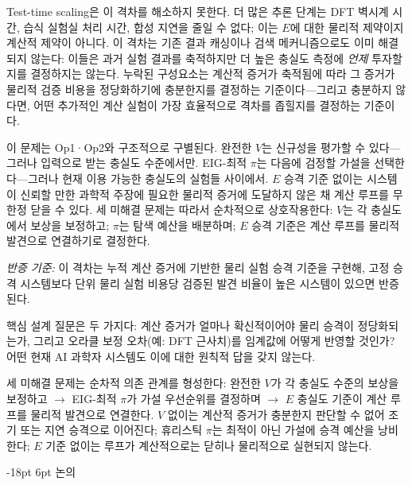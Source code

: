 \documentclass[11pt]{article}
\makeatletter
\renewcommand\section{\@startsection{section}{1}{\z@}%
  {-18pt \@plus -4pt \@minus -2pt}%
  {6pt \@plus 2pt}%
  {\normalfont\large\bfseries}}
\makeatother
\begin{document}
Test-time scaling은 이 격차를 해소하지 못한다. 더 많은 추론 단계는 DFT 벽시계 시간, 습식 실험실 처리 시간, 합성 지연을 줄일 수 없다; 이는 $E$에 대한 물리적 제약이지 계산적 제약이 아니다. 이 격차는 기존 결과 캐싱이나 검색 메커니즘으로도 이미 해결되지 않는다: 이들은 과거 실험 결과를 축적하지만 더 높은 충실도 측정에 \emph{언제} 투자할지를 결정하지는 않는다. 누락된 구성요소는 계산적 증거가 축적됨에 따라 그 증거가 물리적 검증 비용을 정당화하기에 충분한지를 결정하는 기준이다---그리고 충분하지 않다면, 어떤 추가적인 계산 실험이 가장 효율적으로 격차를 좁힐지를 결정하는 기준이다.

이 문제는 Op1·Op2와 구조적으로 구별된다. 완전한 $V$는 신규성을 평가할 수 있다---그러나 입력으로 받는 충실도 수준에서만. EIG-최적 $\pi$는 다음에 검정할 가설을 선택한다---그러나 현재 이용 가능한 충실도의 실험들 사이에서. $E$ 승격 기준 없이는 시스템이 신뢰할 만한 과학적 주장에 필요한 물리적 증거에 도달하지 않은 채 계산 루프를 무한정 닫을 수 있다. 세 미해결 문제는 따라서 순차적으로 상호작용한다: $V$는 각 충실도에서 보상을 보정하고; $\pi$는 탐색 예산을 배분하며; $E$ 승격 기준은 계산 루프를 물리적 발견으로 연결하기로 결정한다.

\textit{반증 기준:} 이 격차는 누적 계산 증거에 기반한 물리 실험 승격 기준을 구현해, 고정 승격 시스템보다 단위 물리 실험 비용당 검증된 발견 비율이 높은 시스템이 있으면 반증된다.

핵심 설계 질문은 두 가지다: 계산 증거가 얼마나 확신적이어야 물리 승격이 정당화되는가, 그리고 오라클 보정 오차(예: DFT 근사치)를 임계값에 어떻게 반영할 것인가? 어떤 현재 AI 과학자 시스템도 이에 대한 원칙적 답을 갖지 않는다.

\noindent 세 미해결 문제는 순차적 의존 관계를 형성한다: 완전한 $V$가 각 충실도 수준의 보상을 보정하고 $\rightarrow$ EIG-최적 $\pi$가 가설 우선순위를 결정하며 $\rightarrow$ $E$ 충실도 기준이 계산 루프를 물리적 발견으로 연결한다. $V$ 없이는 계산적 증거가 충분한지 판단할 수 없어 조기 또는 지연 승격으로 이어진다; 휴리스틱 $\pi$는 최적이 아닌 가설에 승격 예산을 낭비한다; $E$ 기준 없이는 루프가 계산적으로는 닫히나 물리적으로 실현되지 않는다.

\section{논의}
\label{sec:discussion}
\end{document}

